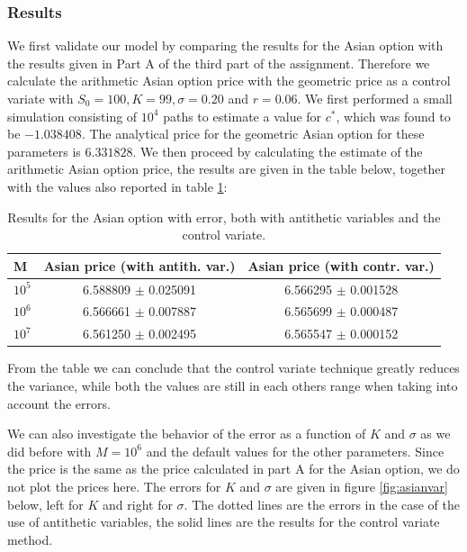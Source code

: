 \documentclass[11pt,a4paper]{article}
\begin{document}
\subsubsection{Results}
We first validate our model by comparing the results for the Asian option with the results given in Part A of the third part of the assignment. Therefore we calculate the arithmetic Asian option price with the geometric price as a control variate with $S_0 = 100, K = 99, \sigma = 0.20$ and $r = 0.06$. We first performed a small simulation consisting of $10^4$ paths to estimate a value for $c^*$, which was found to be $-1.038408$. The analytical price for the geometric Asian option for these parameters is $6.331828$. We then proceed by calculating the estimate of the arithmetic Asian option price, the results are given in the table below, together with the values also reported in table \ref{tab:asian}:

\begin{table}[H]
  \centering
  \begin{tabular}{l || c | c }
    \hline
    M & Asian price (with antith. var.) & Asian price (with contr. var.) \\
    \hline
    $10^5$ & 6.588809 $\pm$ 0.025091 & 6.566295 $\pm$ 0.001528\\
    $10^6$ & 6.566661 $\pm$ 0.007887 & 6.565699 $\pm$ 0.000487\\
    $10^7$ & 6.561250 $\pm$ 0.002495 & 6.565547 $\pm$ 0.000152\\
  \end{tabular}
  \caption{Results for the Asian option with error, both with antithetic variables and the control variate.}
  \label{tab:asian}
\end{table}

From the table we can conclude that the control variate technique greatly reduces the variance, while both the values are still in each others range when taking into account the errors. 

We can also investigate the behavior of the error as a function of $K$ and $\sigma$ as we did before with $M = 10^6$ and the default values for the other parameters. Since the price is the same as the price calculated in part A for the Asian option, we do not plot the prices here. The errors for $K$ and $\sigma$ are given in figure \ref{fig:asianvar} below, left for $K$ and right for $\sigma$. The dotted lines are the errors in the case of the use of antithetic variables, the solid lines are the results for the control variate method.
\end{document}
